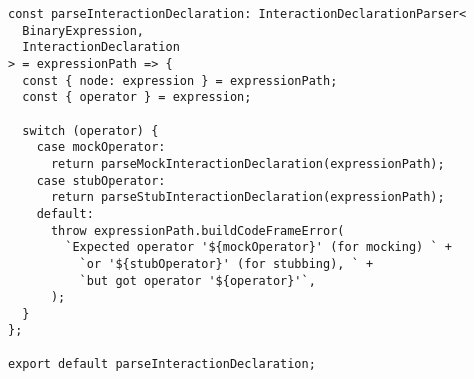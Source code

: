 \begin{verbatim}
const parseInteractionDeclaration: InteractionDeclarationParser<
  BinaryExpression,
  InteractionDeclaration
> = expressionPath => {
  const { node: expression } = expressionPath;
  const { operator } = expression;

  switch (operator) {
    case mockOperator:
      return parseMockInteractionDeclaration(expressionPath);
    case stubOperator:
      return parseStubInteractionDeclaration(expressionPath);
    default:
      throw expressionPath.buildCodeFrameError(
        `Expected operator '${mockOperator}' (for mocking) ` +
          `or '${stubOperator}' (for stubbing), ` +
          `but got operator '${operator}'`,
      );
  }
};

export default parseInteractionDeclaration;
\end{verbatim}
